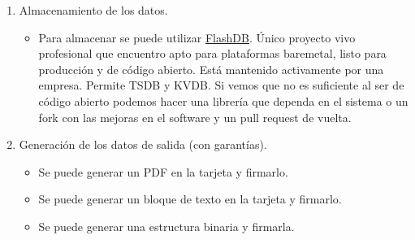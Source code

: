 \begin{enumerate}
   \item Almacenamiento de los datos.
   \begin{itemize}
       \item Para almacenar se puede utilizar \href{https://github.com/armink/FlashDB}{FlashDB}. 
       Único proyecto vivo profesional que encuentro apto para plataformas baremetal, listo para producción y de código abierto. Está mantenido activamente por una empresa. Permite TSDB y KVDB. Si vemos que no es suficiente al ser de código abierto podemos hacer una librería que dependa en el sistema o un fork con las mejoras en el software y un pull request de vuelta.
   \end{itemize}

   \item Generación de los datos de salida (con garantías).
   \begin{itemize}
       \item Se puede generar un PDF en la tarjeta y firmarlo.
       \item Se puede generar un bloque de texto en la tarjeta y firmarlo.
       \item Se puede generar una estructura binaria y firmarla.
   \end{itemize}


\end{enumerate}
